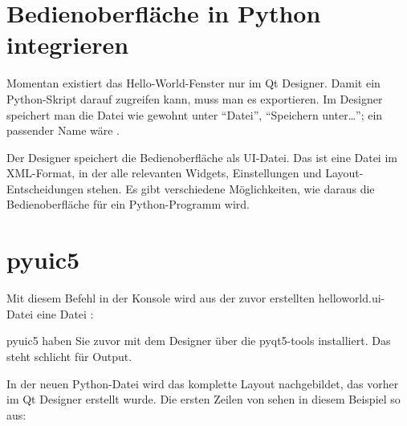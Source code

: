 \section{Bedienoberfläche in Python integrieren}

    
Momentan existiert das Hello-World-Fenster nur im Qt Designer. Damit ein Python-Skript darauf zugreifen kann, muss man es exportieren. Im Designer speichert man die Datei wie gewohnt unter ``Datei'', ``Speichern unter\ldots''; ein passender Name wäre .

Der Designer speichert die Bedienoberfläche als UI-Datei. Das ist eine Datei im XML-Format, in der alle relevanten Widgets, Einstellungen und Layout-Entscheidungen stehen. Es gibt verschiedene Möglichkeiten, wie daraus die Bedienoberfläche für ein Python-Programm wird.

\section{pyuic5}

Mit diesem Befehl in der Konsole wird aus der zuvor erstellten helloworld.ui-Datei eine Datei :

\medskip



\medskip


pyuic5 haben Sie zuvor mit dem Designer über die pyqt5-tools installiert. Das  steht schlicht für Output.

In der neuen Python-Datei wird das komplette Layout nachgebildet, das vorher im Qt Designer erstellt wurde. Die ersten Zeilen von  sehen in diesem Beispiel so aus:

\medskip


\PYTHON{}


\PYTHON{\#}


\PYTHON{\#}



\PYTHON{}

